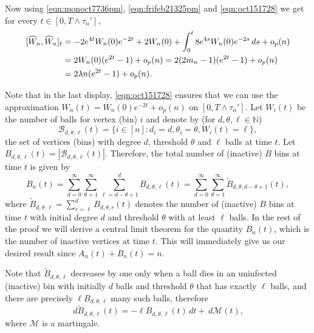 \documentclass[11pt]{article}
\def\NN{\mathbb{N}}
\begin{document}
Now using \eqref{eqn:monoct7736pm}, \eqref{eqn:frifeb21325pm} and \eqref{eqn:oct151728}  we get for every $t \in [0, T\wedge \tau_n']$,
\begin{align}\label{eqn:monoct7746pm}
[\widehat{W}_n, \widehat{W}_n]_t &= -2e^{4t}W_n(0) e^{-2t} +2W_n(0)+ \int_{0}^t 8 e^{4s}W_n(0) e^{-2s} \, ds +o_p(n) \notag\\
&=2W_n(0)(e^{2t}-1) +o_p(n) = 2(2m_n-1)(e^{2t}-1) +o_p(n) \notag\\
&= 2\lambda n (e^{2t}-1) +o_p(n).
\end{align}

Note that in the last display, \eqref{eqn:oct151728} ensures that we can use the approximation $W_n(t)= W_n(0)e^{-2t}+o_p(n)$ on $[0, T\wedge \tau_n']$.  Let $W_i(t)$ be the number of balls for vertex (bin) $i$ and denote by (for $d,\theta, \ell\in \NN$)
$$\mathcal{B}_{d, \theta,\ell}(t) = \{i \in [n]: d_i= d, \theta_i=\theta,  W_i(t)= \ell\},$$ 
the set of vertices (bins) with degree $d$, threshold $\theta$ and $\ell$ balls at time $t$.  Let $B_{d, \theta,\ell}(t)=|\mathcal{B}_{d, \theta,\ell}(t)|$. Therefore, the total number of (inactive) $B$ bins 
at time $t$ is given by
\begin{equation*}
B_n(t)= \sum_{d=0}^{\infty}\sum_{\theta=1}^{\infty}\sum_{ \ell= d-\theta+1}^d B_{d, \theta,\ell}(t)=\sum_{d=0}^{\infty}\sum_{\theta=1}^{\infty} \widetilde{B}_{d,\theta, d-\theta+1}(t), 
\end{equation*}
where $\widetilde{B}_{d,\theta,\ell} = \sum_{r=\ell}^d B_{d, \theta,r}(t)$ denotes the number of (inactive) $B$ bins  at time $t$ with initial degree $d$ and threshold $\theta$ with at least $\ell$ balls. In the rest of the proof we will derive a central limit theorem for the quantity $B_n(t)$, which is the number of inactive vertices at time $t$. This will immediately give us our desired result since $A_n(t)+B_n(t) =n$.

Note that $\widetilde{B}_{d,\theta,\ell}$ decreases by one only when a ball dies in an uninfected (inactive) bin with initially $d$ balls and threshold $\theta$ that has exactly $\ell$ balls, and there are precisely $\ell B_{d,\theta,\ell}$ many such balls, therefore
\begin{equation}\label{eqn:wedoct9538pm}
\, d\widetilde{B}_{d,\theta,\ell}(t) = -\ell B_{d,\theta,\ell}(t)\, dt +\, d\mathcal{M}(t),
\end{equation}
where $\mathcal{M}$ is a martingale. 
\end{document}
